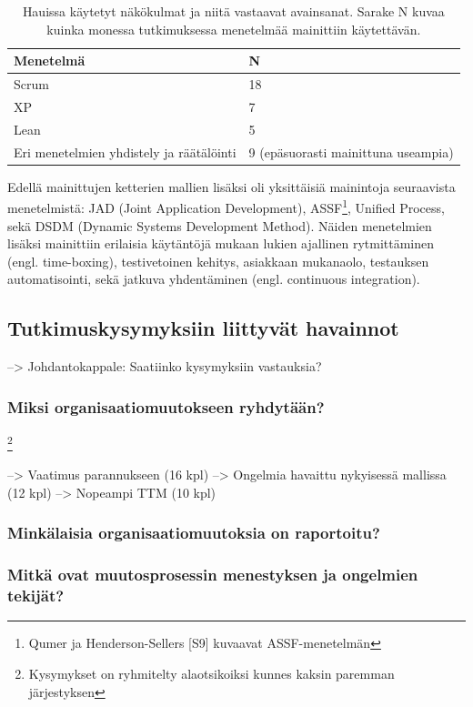 \begin{table}[h]
    \begin{tabular}{|l|l|}
        \hline
        Menetelmä       & N   \\ \hline
        Scrum           & 18 \\ 
        XP              & 7 \\
        Lean            & 5 \\
        Eri menetelmien yhdistely ja räätälöinti & 9  (epäsuorasti mainittuna useampia) \\
        \hline
    \end{tabular}
	\caption{Hauissa käytetyt näkökulmat ja niitä vastaavat avainsanat. Sarake N
	kuvaa kuinka monessa tutkimuksessa menetelmää mainittiin käytettävän.}
	\label{table:practices}
\end{table}

Edellä mainittujen ketterien mallien lisäksi oli yksittäisiä mainintoja
seuraavista menetelmistä: JAD (Joint Application Development),
ASSF\footnote{Qumer ja Henderson-Sellers [S9] kuvaavat ASSF-menetelmän}, Unified Process, sekä DSDM
(Dynamic Systems Development Method). Näiden menetelmien lisäksi mainittiin
erilaisia käytäntöjä mukaan lukien ajallinen rytmittäminen (engl. time-boxing),
testivetoinen kehitys, asiakkaan mukanaolo, testauksen automatisointi, sekä
jatkuva yhdentäminen (engl. continuous integration).

\subsection{Tutkimuskysymyksiin liittyvät havainnot}

--> Johdantokappale: Saatiinko kysymyksiin vastauksia?

\subsubsection{Miksi organisaatiomuutokseen ryhdytään?}
\footnote{Kysymykset on ryhmitelty alaotsikoiksi kunnes kaksin paremman järjestyksen}

--> Vaatimus parannukseen (16 kpl)
--> Ongelmia havaittu nykyisessä mallissa (12 kpl)
--> Nopeampi TTM (10 kpl)

\subsubsection{Minkälaisia organisaatiomuutoksia on raportoitu?}


\subsubsection{Mitkä ovat muutosprosessin menestyksen ja ongelmien tekijät?}

